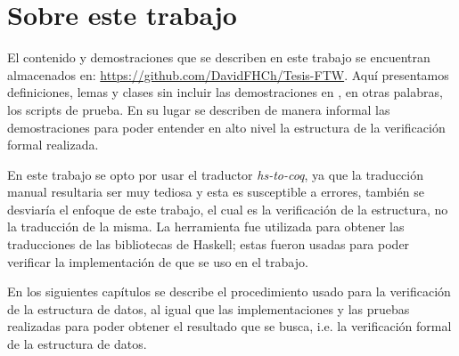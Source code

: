 \section{Sobre este trabajo}
El contenido y demostraciones que se describen en este trabajo se encuentran almacenados en:
\url{https://github.com/DavidFHCh/Tesis-FTW}. Aqu\'i presentamos definiciones, lemas y clases sin
incluir las demostraciones en {\coq}, en otras palabras, los scripts de prueba. En su lugar se describen de manera informal las demostraciones para poder entender en alto nivel la estructura de la verificaci\'on formal realizada.

En este trabajo se opto por usar el traductor \textit{hs-to-coq}, ya que la traducci\'on manual
resultaria ser muy tediosa y esta es susceptible a errores, tambi\'en se desviaría el enfoque de
este trabajo, el cual es la verificaci\'on de la estructura, no la traducci\'on de la misma. La
herramienta fue utilizada para obtener las traducciones de las bibliotecas de Haskell; estas fueron
usadas para poder verificar la implementación de {\arns} \cite{MSetRBT} que se uso en el trabajo.

En los siguientes capítulos se describe el procedimiento usado para la verificaci\'on de la
estructura de datos, al igual que las implementaciones y las pruebas realizadas para poder obtener
el resultado que se busca, i.e. la verificación formal de la estructura de datos.
